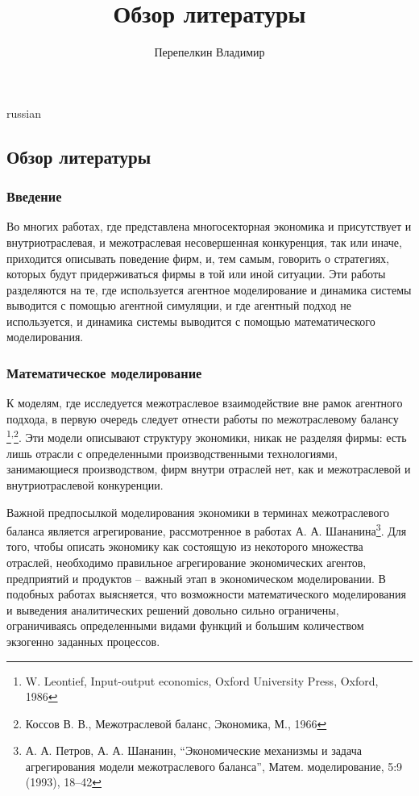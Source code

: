 \documentclass[9pt]{article}
\begin{document}
\title{\foreignlanguage{russian}{Обзор литературы}}
\author{\foreignlanguage{russian}{Перепелкин Владимир}}
\maketitle
\begin{otherlanguage*}{russian}
\subsection*{Обзор литературы}
\subsubsection*{Введение}
Во многих работах, где представлена многосекторная экономика и присутствует и внутриотраслевая, и межотраслевая несовершенная конкуренция, так или иначе, приходится описывать поведение фирм, и, тем самым, говорить о стратегиях, которых будут придерживаться фирмы в той или иной ситуации. Эти работы разделяются на те, где используется агентное моделирование и динамика системы выводится с помощью агентной симуляции, и где агентный подход не используется, и динамика системы выводится с помощью математического моделирования.
\subsubsection*{Математическое моделирование}
К моделям, где исследуется межотраслевое взаимодействие вне рамок агентного подхода, в первую очередь следует отнести работы  по межотраслевому балансу \footnote{ W. Leontief, Input-output economics, Oxford University Press, Oxford, 1986}\textsuperscript{,}\footnote{ Коссов В. В., Межотраслевой баланс, Экономика, М., 1966}. Эти модели описывают структуру экономики, никак не разделяя фирмы: есть лишь отрасли с определенными производственными технологиями, занимающиеся производством, фирм внутри отраслей нет, как и межотраслевой и внутриотраслевой конкуренции.

Важной предпосылкой моделирования экономики в терминах межотраслевого баланса является агрегирование, рассмотренное в работах А. А. Шананина\footnote{А. А. Петров, А. А. Шананин, “Экономические механизмы и задача агрегирования модели межотраслевого баланса”, Матем. моделирование, 5:9 (1993), 18–42}. Для того, чтобы описать экономику как состоящую из некоторого множества отраслей, необходимо правильное агрегирование экономических агентов, предприятий и продуктов -- важный этап в экономическом моделировании. В подобных работах выясняется, что возможности математического моделирования и выведения аналитических решений довольно сильно ограничены, ограничиваясь определенными видами функций и большим количеством экзогенно заданных процессов. 


\end{otherlanguage*}
\end{document}
